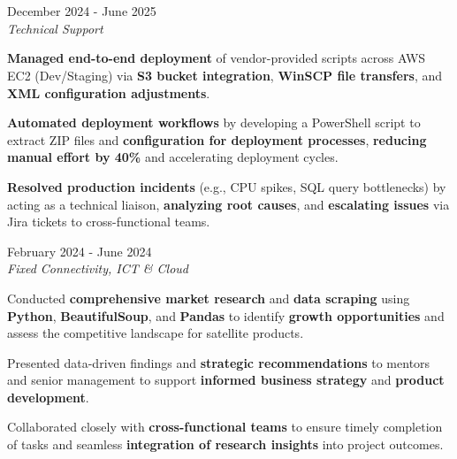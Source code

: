 \documentclass[../main.tex]{subfiles}
\begin{document}
\section{}

\begin{twocolentry}{December 2024 - June 2025}
     \\
    \vspace{0.10 cm}
    \textit{Technical Support}
\end{twocolentry}

\vspace{0.10 cm}
\begin{onecolentry}
\begin{highlights}
    \item \textbf{Managed end-to-end deployment} of vendor-provided scripts across AWS EC2 (Dev/Staging) via \textbf{S3 bucket integration}, \textbf{WinSCP file transfers}, and \textbf{XML configuration adjustments}.
    \item \textbf{Automated deployment workflows} by developing a PowerShell script to extract ZIP files and \textbf{configuration for deployment processes}, \textbf{reducing manual effort by 40\%} and accelerating deployment cycles.
    \item \textbf{Resolved production incidents} (e.g., CPU spikes, SQL query bottlenecks) by acting as a technical liaison, \textbf{analyzing root causes}, and \textbf{escalating issues} via Jira tickets to cross-functional teams.
\end{highlights}
\end{onecolentry}

\vspace{0.4 cm}

\begin{twocolentry}{February 2024 - June 2024}
     \\
    \vspace{0.10 cm}
    \textit{Fixed Connectivity, ICT \& Cloud}
\end{twocolentry}

\vspace{0.10 cm}
\begin{onecolentry}
\begin{highlights}
    \item Conducted \textbf{comprehensive market research} and \textbf{data scraping} using \textbf{Python}, \textbf{BeautifulSoup}, and \textbf{Pandas} to identify \textbf{growth opportunities} and assess the competitive landscape for satellite products.
    \item Presented data-driven findings and \textbf{strategic recommendations} to mentors and senior management to support \textbf{informed business strategy} and \textbf{product development}.
    \item Collaborated closely with \textbf{cross-functional teams} to ensure timely completion of tasks and seamless \textbf{integration of research insights} into project outcomes.
\end{highlights}
\end{onecolentry}
\end{document}
